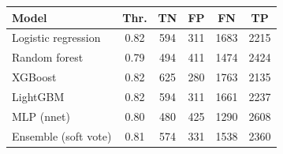 \begin{tabular}{lccccc}
\toprule
\textbf{Model} & \textbf{Thr.} & \textbf{TN} & \textbf{FP} & \textbf{FN} & \textbf{TP} \\
\midrule
Logistic regression & 0.82 & 594 & 311 & 1683 & 2215 \\
Random forest & 0.79 & 494 & 411 & 1474 & 2424 \\
XGBoost & 0.82 & 625 & 280 & 1763 & 2135 \\
LightGBM & 0.82 & 594 & 311 & 1661 & 2237 \\
MLP (nnet) & 0.80 & 480 & 425 & 1290 & 2608 \\
Ensemble (soft vote) & 0.81 & 574 & 331 & 1538 & 2360 \\
\bottomrule
\end{tabular}
